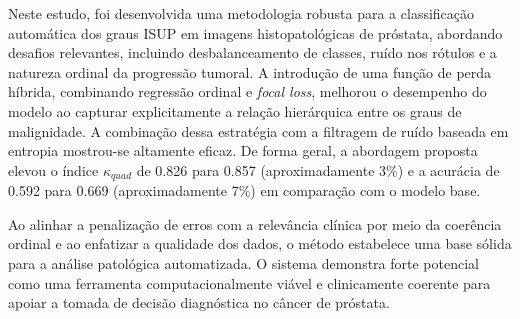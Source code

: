 Neste estudo, foi desenvolvida uma metodologia robusta para a classificação automática dos graus ISUP em imagens histopatológicas de próstata, abordando desafios relevantes, incluindo desbalanceamento de classes, ruído nos rótulos e a natureza ordinal da progressão tumoral. A introdução de uma função de perda híbrida, combinando regressão ordinal e \textit{focal loss}, melhorou o desempenho do modelo ao capturar explicitamente a relação hierárquica entre os graus de malignidade. A combinação dessa estratégia com a filtragem de ruído baseada em entropia mostrou-se altamente eficaz. De forma geral, a abordagem proposta elevou o índice $\kappa_{quad}$ de 0.826 para 0.857 (aproximadamente 3\%) e a acurácia de 0.592 para 0.669 (aproximadamente 7\%) em comparação com o modelo base.

Ao alinhar a penalização de erros com a relevância clínica por meio da coerência ordinal e ao enfatizar a qualidade dos dados, o método estabelece uma base sólida para a análise patológica automatizada. O sistema demonstra forte potencial como uma ferramenta computacionalmente viável e clinicamente coerente para apoiar a tomada de decisão diagnóstica no câncer de próstata.